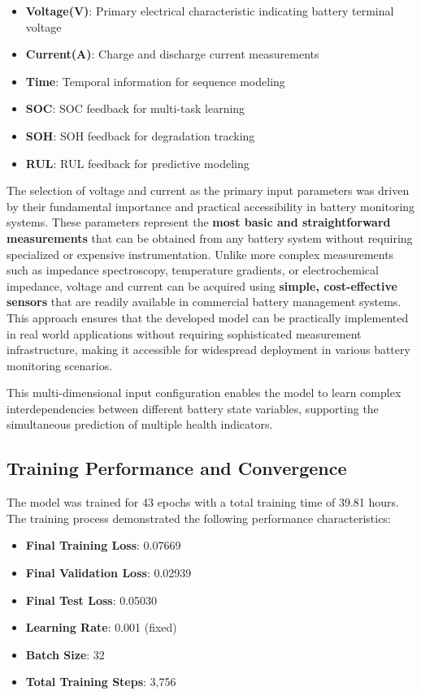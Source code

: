 \begin{itemize}
    \item \textbf{Voltage(V)}: Primary electrical characteristic indicating battery terminal voltage
    \item \textbf{Current(A)}: Charge and discharge current measurements
    \item \textbf{Time}: Temporal information for sequence modeling
    \item \textbf{SOC}: SOC feedback for multi-task learning
    \item \textbf{SOH}: SOH feedback for degradation tracking
    \item \textbf{RUL}: RUL feedback for predictive modeling
\end{itemize}

The selection of voltage and current as the primary input parameters was driven by their fundamental importance and practical accessibility in battery monitoring systems. These parameters represent the \textbf{most basic and straightforward measurements} that can be obtained from any battery system without requiring specialized or expensive instrumentation. Unlike more complex measurements such as impedance spectroscopy, temperature gradients, or electrochemical impedance, voltage and current can be acquired using \textbf{simple, cost-effective sensors} that are readily available in commercial battery management systems. This approach ensures that the developed model can be practically implemented in real world applications without requiring sophisticated measurement infrastructure, making it accessible for widespread deployment in various battery monitoring scenarios.

This multi-dimensional input configuration enables the model to learn complex interdependencies between different battery state variables, supporting the simultaneous prediction of multiple health indicators.

\subsection{Training Performance and Convergence}
\label{subsec:training_performance}

The model was trained for 43 epochs with a total training time of 39.81 hours. The training process demonstrated the following performance characteristics:

\begin{itemize}
    \item \textbf{Final Training Loss}: 0.07669
    \item \textbf{Final Validation Loss}: 0.02939
    \item \textbf{Final Test Loss}: 0.05030
    \item \textbf{Learning Rate}: 0.001 (fixed)
    \item \textbf{Batch Size}: 32
    \item \textbf{Total Training Steps}: 3,756
\end{itemize}

